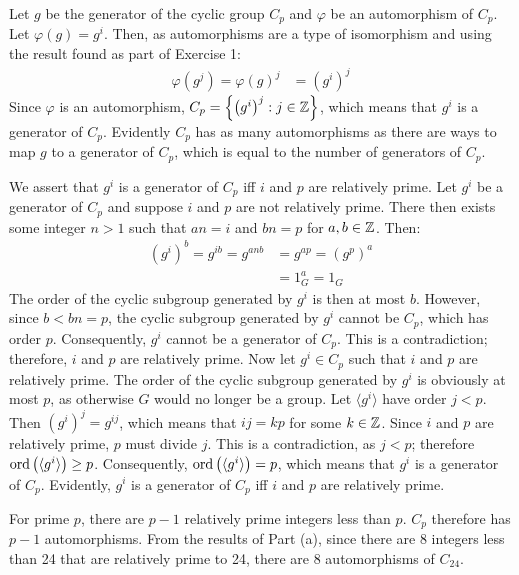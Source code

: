 \documentclass{article}
\begin{document}
\clearpage

\problem
{}
Let $g$ be the generator of the cyclic group $C_p$ and $\varphi$ be an automorphism of $C_p$. Let $\varphi\left(g\right) = g^i$. Then, as automorphisms are a type of isomorphism and using the result found as part of Exercise 1:
\begin{equation}
    \begin{split}
        \varphi\left(g^j\right) = \varphi\left(g\right)^j & = \left(g^i\right)^j
    \end{split}
\end{equation}
Since $\varphi$ is an automorphism, $C_p = \left\{\left(g^i\right)^j : j \in \mathbb{Z} \right\}$, which means that $g^i$ is a generator of $C_p$. Evidently $C_p$ has as many automorphisms as there are ways to map $g$ to a generator of $C_p$, which is equal to the number of generators of $C_p$.

We assert that $g^i$ is a generator of $C_p$ iff $i$ and $p$ are relatively prime. Let $g^i$ be a generator of $C_p$ and suppose $i$ and $p$ are not relatively prime. There then exists some integer $n > 1$ such that $an = i$ and $bn = p$ for $a, b \in \mathbb{Z}$. Then:
\begin{equation}
    \begin{split}
        \left(g^{i}\right)^b = g^{ib} = g^{anb} & = g^{ap} = \left(g^p\right)^a \\
        & = 1_G^a = 1_G
    \end{split}
\end{equation}
The order of the cyclic subgroup generated by $g^i$ is then at most $b$. However, since $b < bn = p$, the cyclic subgroup generated by $g^i$ cannot be $C_p$, which has order $p$. Consequently, $g^i$ cannot be a generator of $C_p$. This is a contradiction; therefore, $i$ and $p$ are relatively prime. Now let $g^i \in C_p$ such that $i$ and $p$ are relatively prime. The order of the cyclic subgroup generated by $g^i$ is obviously at most $p$, as otherwise $G$ would no longer be a group. Let $\langle g^i \rangle$ have order $j < p$. Then $\left(g^i\right)^j = g^{ij}$, which means that $ij = kp$ for some $k \in \mathbb{Z}$. Since $i$ and $p$ are relatively prime, $p$ must divide $j$. This is a contradiction, as $j < p$; therefore $\operatorname{ord}\left(\langle g^i \rangle\right) \geq p$. Consequently, $\operatorname{ord}\left(\langle g^i \rangle\right) = p$, which means that $g^i$ is a generator of $C_p$. Evidently, $g^i$ is a generator of $C_p$ iff $i$ and $p$ are relatively prime.

For prime $p$, there are $p - 1$ relatively prime integers less than $p$. $C_p$ therefore has $p - 1$ automorphisms.
From the results of Part (a), since there are 8 integers less than 24 that are relatively prime to 24, there are 8 automorphisms of $C_{24}$.
\end{document}
